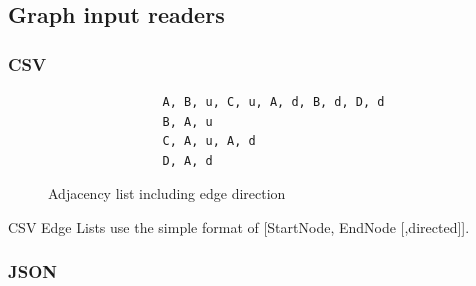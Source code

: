 	\subsection{Graph input readers}
	\label{ssect:input_output}
	
		\subsubsection{CSV}
		\label{sssection: io_csv}
		
		
		\begin{figure}[ht]
			\begin{lstlisting}
				A, B, u, C, u, A, d, B, d, D, d
				B, A, u
				C, A, u, A, d
				D, A, d
			\end{lstlisting}
			\caption{Adjacency list including edge direction}
			\label{fig:adj_list_direction}
		\end{figure}
		
		CSV Edge Lists use the simple format of [StartNode, EndNode [,directed]].		
			
		
		\subsubsection{JSON}
		\label{sssection: io_json}
		
